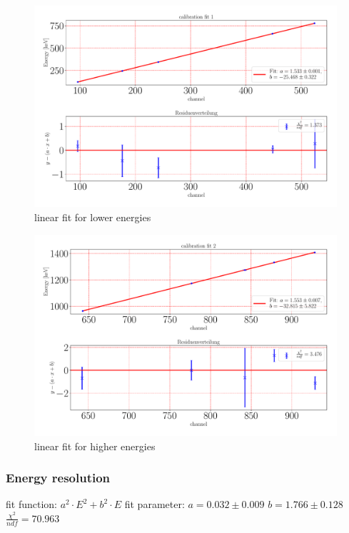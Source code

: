 \documentclass[a4paper,12pt]{article}
\begin{document}
\begin{figure}
\center
\includegraphics[scale=0.3]{../Figures/calibration fit 1.pdf}
\caption{linear fit for lower energies}
\label{calibFit}
\end{figure}

\begin{figure}
\center
\includegraphics[scale=0.3]{../Figures/calibration fit 2.pdf}
\caption{linear fit for higher energies}
\label{calibFit}
\end{figure}

\subsubsection{Energy resolution}

fit function: \newline
$a^2 \cdot E^2 + b^2 \cdot E$ \newline
fit parameter: \newline
$a = 0.032\pm0.009$ \newline
$b = 1.766\pm0.128$ \newline
$\frac{\chi^2}{ndf} = 70.963$ \newline
\end{document}
